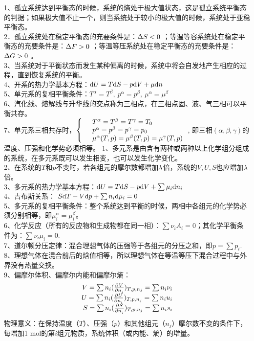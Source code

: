 \documentclass[UTF8,9pt]{ctexart}
\begin{document}
1、孤立系统达到平衡态的时候，系统的熵处于极大值状态，这是孤立系统平衡态的判据；如果极大值不止一个，则当系统处于较小的极大值的时候，系统处于亚稳平衡态。\\
2．孤立系统处在稳定平衡态的充要条件是：$\Delta S<0$ ；等温等容系统处在稳定平衡态的充要条件是：$\Delta F>0$ ；等温等压系统处在稳定平衡态的充要条件是：$\Delta G>0$ 。\\
3、当系统对于平衡状态而发生某种偏离的时候，系统中将会自发地产生相应的过程，直到恢复系统的平衡。\\
4、开系的热力学基本方程：$\mathrm{d} U=T\mathrm{d} S-p\mathrm{d} V+\mu \mathrm{d} n$\\
5、单元系的复相平衡条件：$T^\alpha=T^\beta,\ p^\alpha=p^\beta,\ \mu^\alpha=\mu^\beta$\\ 
6、汽化线、熔解线与升华线的交点称为三相点，在三相点固、液、气三相可以平衡共存。\\
7、单元系三相共存时，$\left\{\begin{array}{rl} &T^\alpha=T^\beta=T^\gamma=T_0\\
&p^\alpha=p^\beta=p^\gamma=p_0\\
&\mu^\alpha(T,p)=\mu^\beta(T,p)=\mu^\gamma(T,p) \end{array}\right.$,  即三相$(\alpha,\beta,\gamma)$的温度、压强和化学势必须相等。
1、多元系是由含有两种或两种以上化学组分组成的系统，在多元系既可以发生相变，也可以发生化学变化。\\
2、在系统的$T$和$p$不变时，若各组元的摩尔数都增加$\lambda$倍，系统的$V,U,S$也应增加$\lambda$倍。\\
3、多元系的热力学基本方程：$\mathrm{d} U=T\mathrm{d} S-p\mathrm{d} V+\sum\mu_i\mathrm{d} n_i$\\
4、吉布斯关系： $S\mathrm{d} T-V\mathrm{d} p+\sum n_i\mathrm{d} \mu_i=0$\\
5、多元系的复相平衡条件：整个系统达到平衡的时候，两相中各组元的化学势必须分别相等，即$\mu_i^\alpha=\mu_i^\beta$。\\
6、化学反应（所有的反应物和生成物都在同一相）：$\sum\nu_iA_i=0$；其化学平衡条件为：$\sum\nu_i\mu_i=0$.\\
7、道尔顿分压定律：混合理想气体的压强等于各组元的分压之和，即$p=\sum p_i$.\\
8、理想气体在混合前后的焓值相等，所以理想气体在等温等压下混合过程中与外界没有热量交换。\\
9、偏摩尔体积、偏摩尔内能和偏摩尔熵：
$$\begin{array}{rl} 
    V=\sum n_i(\frac{\partial^{} V}{\partial n_i^{}})_{T,p,n_j}=\sum n_i\nu_i\\
    U=\sum n_i(\frac{\partial^{} U}{\partial n_i^{}})_{T,p,n_j}=\sum n_iu_i\\
    S=\sum n_i(\frac{\partial^{} S}{\partial n_i^{}})_{T,p,n_j}=\sum n_is_i
 \end{array}$$
物理意义：在保持温度（$T$）、压强（$p$）和其他组元（$n_j$）摩尔数不变的条件下，每增加1 mol的第$i$组元物质，系统体积（或内能、熵）的增量。\\
\end{document}
